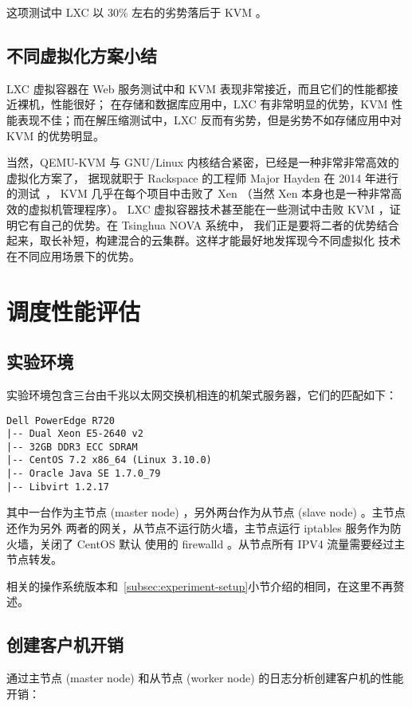这项测试中 LXC 以 $30\%$ 左右的劣势落后于 KVM 。

\subsection{不同虚拟化方案小结}

LXC 虚拟容器在 Web 服务测试中和 KVM 表现非常接近，而且它们的性能都接近裸机，性能很好；
在存储和数据库应用中，LXC 有非常明显的优势，KVM 性能表现不佳；而在解压缩测试中，LXC
反而有劣势，但是劣势不如存储应用中对 KVM 的优势明显。

当然，QEMU-KVM 与 GNU/Linux 内核结合紧密，已经是一种非常非常高效的虚拟化方案了，
据现就职于 Rackspace 的工程师 Major Hayden 在 2014 年进行的测试~\cite{kvm-vs-xen}，
KVM 几乎在每个项目中击败了 Xen （当然 Xen 本身也是一种非常高效的虚拟机管理程序）。
LXC 虚拟容器技术甚至能在一些测试中击败 KVM ，证明它有自己的优势。在 Tsinghua NOVA 系统中，
我们正是要将二者的优势结合起来，取长补短，构建混合的云集群。这样才能最好地发挥现今不同虚拟化
技术在不同应用场景下的优势。

\section{调度性能评估}

\subsection{实验环境}

实验环境包含三台由千兆以太网交换机相连的机架式服务器，它们的匹配如下：

\begin{lstlisting}
Dell PowerEdge R720
|-- Dual Xeon E5-2640 v2
|-- 32GB DDR3 ECC SDRAM
|-- CentOS 7.2 x86_64 (Linux 3.10.0)
|-- Oracle Java SE 1.7.0_79
|-- Libvirt 1.2.17
\end{lstlisting}

其中一台作为主节点 (master node) ，另外两台作为从节点 (slave node) 。主节点还作为另外
两者的网关，从节点不运行防火墙，主节点运行 iptables 服务作为防火墙，关闭了 CentOS 默认
使用的 firewalld 。从节点所有 IPV4 流量需要经过主节点转发。

相关的操作系统版本和~\ref{subsec:experiment-setup}小节介绍的相同，在这里不再赘述。

\subsection{创建客户机开销}

通过主节点 (master node) 和从节点 (worker node) 的日志分析创建客户机的性能开销：

